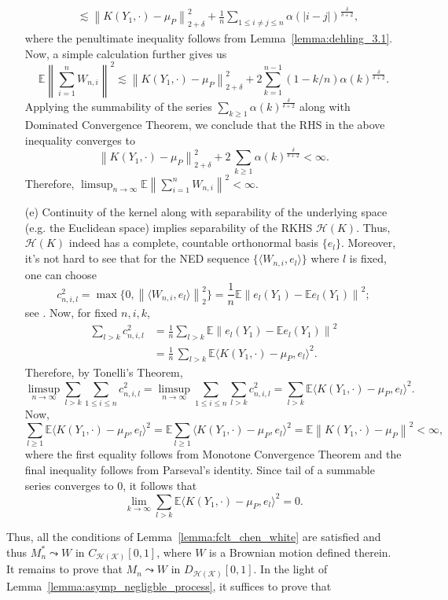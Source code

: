 \documentclass[11pt]{article}
\newcommand{\cH}{\mathcal{H}}
\newcommand{\bE}{\mathbb{E}}
\theoremstyle{plain}
\theoremstyle{definition}
\theoremstyle{remark}
\begin{document}
\begin{appendix}
\begin{enumerate}
\begin{align*}
        &\lesssim \left\|K(Y_1,\cdot)-\mu_P\right\|_{2+\delta}^2+ \frac{1}{n} \sum_{1\leq i\neq j \leq n}\alpha(|i-j|)^{\frac{\delta}{\delta+2}},
    \end{align*}
    where the penultimate inequality follows from Lemma~\ref{lemma:dehling_3.1}. Now, a simple calculation  further gives us
    \[\bE \left\|\sum_{i=1}^{n} W_{n,i}\right\|^2 \lesssim \left\|K(Y_1,\cdot)-\mu_P\right\|_{2+\delta}^2+2 \sum_{k=1}^{n-1}(1-k/n)\alpha(k)^{\frac{\delta}{\delta+2}}.\]
    Applying the summability of the series $\sum_{k\geq 1}\alpha(k)^{\frac{\delta}{\delta+2}}$ along with Dominated Convergence Theorem, we conclude that the RHS in the above inequality converges to 
    \[\left\|K(Y_1,\cdot)-\mu_P\right\|_{2+\delta}^2+2\,\sum_{k\geq 1}\alpha(k)^{\frac{\delta}{\delta+2}}<\infty.\]
    Therefore, \(\limsup_{n \to \infty} \bE \left\|\sum_{i=1}^{n} W_{n,i}\right\|^2<\infty.\)
    \item [(e)] Continuity of the kernel along with separability of the underlying space (e.g. the Euclidean space) implies separability of the RKHS $\cH(K)$. Thus, $\cH(K)$ indeed has a complete, countable orthonormal basis $\{e_l\}$. Moreover, it's not hard to see that for the NED sequence $\{\langle W_{n,i},e_l\rangle\}$ where $l$ is fixed, one can choose \[c^2_{n,i,l}=\max\{0,\left\|\langle W_{n,i},e_l\rangle\right\|_2^2\}=\frac{1}{n}\bE\left\|e_l(Y_1)-\bE e_l(Y_1)\right\|^2;\] 
    see \cite{wooldridge1988some}. Now, for fixed $n,i,k$, 
    \begin{align*}
        \sum_{l> k} c^2_{n,i,l}&=\frac{1}{n}\sum_{l> k}\bE\left\|e_l(Y_1)-\bE e_l(Y_1)\right\|^2\\
        &=\frac{1}{n}\,\sum_{l> k}\bE\langle K(Y_1,\cdot)-\mu_P, e_l\rangle^2.
    \end{align*}
    Therefore, by Tonelli's Theorem,
    \[\limsup_{n \to \infty}\sum_{l>k}\sum_{1\leq i \leq n}c^2_{n,i,l}=\limsup_{n \to \infty}\sum_{1\leq i \leq n}\sum_{l>k}c_{n,i,l}^2= \sum_{l> k}\bE\langle K(Y_1,\cdot)-\mu_P, e_l\rangle^2.\]
    Now,
    \[\sum_{l\geq 1}\bE\langle K(Y_1,\cdot)-\mu_P, e_l\rangle^2=\bE\sum_{l\geq 1}\langle K(Y_1,\cdot)-\mu_P, e_l\rangle^2=\bE \left\|K(Y_1,\cdot)-\mu_P\right\|^2<\infty,\]
    where the first equality follows from Monotone Convergence Theorem and the final inequality follows from Parseval's identity. Since tail of a summable series converges to $0$, it follows that
    \[\lim_{k \to \infty} \sum_{l> k}\bE\langle K(Y_1,\cdot)-\mu_P, e_l\rangle^2=0.\]
\end{enumerate}
Thus, all the conditions of Lemma~\ref{lemma:fclt_chen_white} are satisfied and thus $M_n^*\leadsto W$ in $C_{\mathcal{H(K)}}[0,1]$, where $W$ is a Brownian motion defined therein. It remains to prove that $M_n\leadsto W$ in $D_{\mathcal{H(K)}}[0,1]$. In the light of Lemma~\ref{lemma:asymp_negligble_process}, it suffices to prove that 

\end{appendix}
\end{document}
